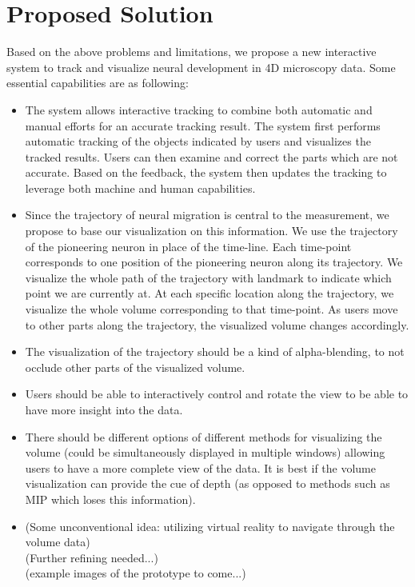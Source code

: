 \documentclass{article}
\begin{document}
\section{Proposed Solution}
Based on the above problems and limitations, we propose a new interactive system to track and visualize neural development in 4D microscopy data. Some essential capabilities are as following:
\begin{itemize}
    \item
    The system allows interactive tracking to combine both automatic and manual efforts for an accurate tracking result. The system first performs automatic tracking of the objects indicated by users and visualizes the tracked results. Users can then examine and correct the parts which are not accurate. Based on the feedback, the system then updates the tracking to leverage both machine and human capabilities.
    \item
    Since the trajectory of neural migration is central to the measurement, we propose to base our visualization on this information. We use the trajectory of the pioneering neuron in place of the time-line. Each time-point corresponds to one position of the pioneering neuron along its trajectory. We visualize the whole path of the trajectory with landmark to indicate which point we are currently at. At each specific location along the trajectory, we visualize the whole volume corresponding to that time-point. As users move to other parts along the trajectory, the visualized volume changes accordingly.
    \item
    The visualization of the trajectory should be a kind of alpha-blending, to not occlude other parts of the visualized volume.
    \item
    Users should be able to interactively control and rotate the view to be able to have more insight into the data.
    \item
    There should be different options of different methods for visualizing the volume (could be simultaneously displayed in multiple windows) allowing users to have a more complete view of the data. It is best if the volume visualization can provide the cue of depth (as opposed to methods such as MIP which loses this information).\\
    \item
    (Some unconventional idea: utilizing virtual reality to navigate through the volume data)\\
    (Further refining needed...)\\
    (example images of the prototype to come...)
    
\end{itemize}
\end{document}
